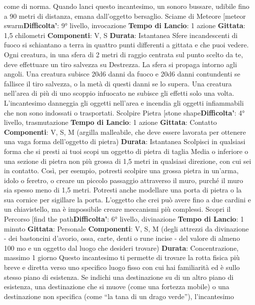 \begin{multicols}{2}
come di norma.
Quando lanci questo incantesimo, un sonoro bussare,
udibile fino a 90 metri di distanza, emana dall’oggetto
bersaglio.
Sciame di Meteore
[meteor swarm\textbf{Difficolta'}:
9° livello, invocazione
\textbf{Tempo di Lancio}: 1 azione
\textbf{Gittata}: 1,5 chilometri
\textbf{Componenti}: V, S
\textbf{Durata}: Istantanea
Sfere incandescenti di fuoco si schiantano a terra in
quattro punti differenti a gittata e che puoi vedere. Ogni
creatura, in una sfera di 2 metri di raggio centrata sul
punto scelto da te, deve effettuare un tiro salvezza su
Destrezza. La sfera si propaga intorno agli angoli. Una
creatura subisce 20d6 danni da fuoco e 20d6 danni
contundenti se fallisce il tiro salvezza, o la metà di
questi danni se lo supera. Una creatura nell’area di più
di uno scoppio infuocato ne subisce gli effetti solo una
volta.
L’incantesimo danneggia gli oggetti nell’area e incendia
gli oggetti infiammabili che non sono indossati o
trasportati.
Scolpire Pietra
[stone shape\textbf{Difficolta'}:
4° livello, trasmutazione
\textbf{Tempo di Lancio}: 1 azione
\textbf{Gittata}: Contatto
\textbf{Componenti}: V, S, M (argilla malleabile, che deve
essere lavorata per ottenere una vaga forma
dell’oggetto di pietra)
\textbf{Durata}: Istantanea
Scolpisci in qualsiasi forma che si presti ai tuoi scopi un
oggetto di pietra di taglia Media o inferiore o una
sezione di pietra non più grossa di 1,5 metri in qualsiasi
direzione, con cui sei in contatto.
Così, per esempio, potresti scolpire una grossa pietra in
un’arma, idolo o feretro, o creare un piccolo passaggio
attraverso il muro, purché il muro sia spesso meno di
1,5 metri. Potresti anche modellare una porta di pietra o
la sua cornice per sigillare la porta. L’oggetto che crei
può avere fino a due cardini e un chiavistello, ma è
impossibile creare meccanismi più complessi.
Scopri il Percorso
[find the path\textbf{Difficolta'}:
6° livello, divinazione
\textbf{Tempo di Lancio}: 1 minuto
\textbf{Gittata}: Personale
\textbf{Componenti}: V, S, M (degli attrezzi da divinazione -
dei bastoncini d’avorio, ossa, carte, denti o rune incise -
del valore di almeno 100 mo e un oggetto dal luogo che
desideri trovare)
\textbf{Durata}: Concentrazione, massimo 1 giorno
Questo incantesimo ti permette di trovare la rotta fisica
più breve e diretta verso uno specifico luogo fisso con
cui hai familiarità ed è sullo stesso piano di esistenza.
Se indichi una destinazione su di un altro piano di
esistenza, una destinazione che si muove (come una 
fortezza mobile) o una destinazione non specifica
(come “la tana di un drago verde”), l’incantesimo

\end{multicols}
